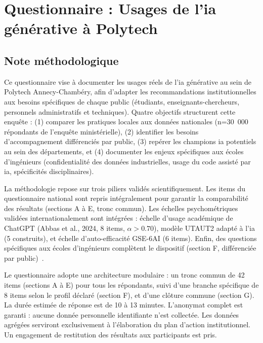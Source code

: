 \appendix

\section{Questionnaire : Usages de l'\gls{ia} générative à Polytech}
\label{annexe:questionnaire}

\subsection*{Note méthodologique}

Ce questionnaire vise à documenter les usages réels de l'\gls{ia} générative au sein de Polytech Annecy-Chambéry, afin d'adapter les recommandations institutionnelles aux besoins spécifiques de chaque public (étudiants, enseignants-chercheurs, personnels administratifs et techniques). Quatre objectifs structurent cette enquête : (1) comparer les pratiques locales aux données nationales (n=30~000 répondants de l'enquête ministérielle), (2) identifier les besoins d'accompagnement différenciés par public, (3) repérer les champions \gls{ia} potentiels au sein des départements, et (4) documenter les enjeux spécifiques aux écoles d'ingénieurs (confidentialité des données industrielles, usage du code assisté par \gls{ia}, spécificités disciplinaires).

La méthodologie repose sur trois piliers validés scientifiquement. Les items du questionnaire national sont repris intégralement pour garantir la comparabilité des résultats (sections A à E, tronc commun). Les échelles psychométriques validées internationalement sont intégrées : échelle d'usage académique de ChatGPT (Abbas et al., 2024, 8 items, $\alpha>0.70$), modèle UTAUT2 adapté à l'\gls{ia} (5 construits), et échelle d'auto-efficacité GSE-6AI (6 items). Enfin, des questions spécifiques aux écoles d'ingénieurs complètent le dispositif (section F, différenciée par public)~\cite{pascal2025ia,cge2024enquete,abbas2024harmful}.

Le questionnaire adopte une architecture modulaire : un tronc commun de 42 items (sections A à E) pour tous les répondants, suivi d'une branche spécifique de 8 items selon le profil déclaré (section F), et d'une clôture commune (section G). La durée estimée de réponse est de 10 à 13 minutes. L'anonymat complet est garanti : aucune donnée personnelle identifiante n'est collectée. Les données agrégées serviront exclusivement à l'élaboration du plan d'action institutionnel. Un engagement de restitution des résultats aux participants est pris.

